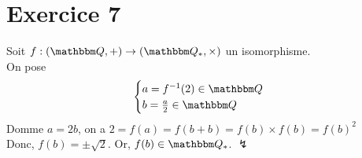 \part{Exercice 7}

Soit $f: \left( \Q, + \right) \to \left( \Q_*, \times  \right)$ un isomorphisme.\\

On pose  \[
	\begin{cases}
		a = f^{-1}(2) \in \Q\\
		b = \frac{a}{2} \in \Q
	\end{cases}
\] Domme $a = 2b$, on a $2 = f(a) = f(b + b) = f(b)\times f(b) = f(b)^2$\\
Donc, $f(b) = \pm \sqrt{2}$. Or, $f(b) \in \Q_*$.
$\lightning$
